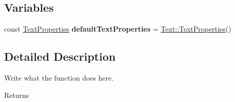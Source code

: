 \subsection*{Variables}
\begin{DoxyCompactItemize}
\item 
\hypertarget{namespaceText_a074c44595a1036ca6d8b6f7255bf0b75}{const \hyperlink{structText_1_1TextProperties}{Text\+Properties} {\bfseries default\+Text\+Properties} = \hyperlink{structText_1_1TextProperties}{Text\+::\+Text\+Properties}()}\label{namespaceText_a074c44595a1036ca6d8b6f7255bf0b75}

\end{DoxyCompactItemize}


\subsection{Detailed Description}
Write what the function does here. 

\begin{DoxyReturn}{Returns}

\end{DoxyReturn}
